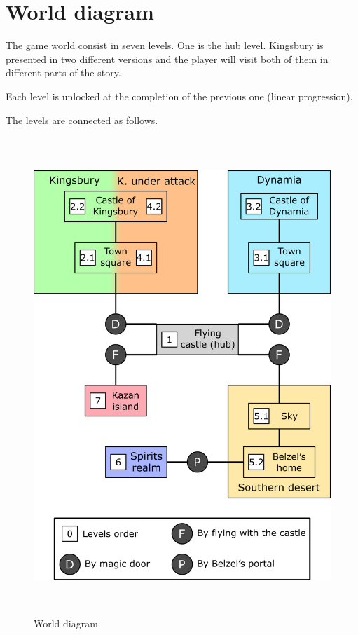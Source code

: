 \pagebreak %

\section{World diagram}

The game world consist in seven levels. One is the hub level. Kingsbury is presented in two different versions and the player will visit both of them in different parts of the story.

Each level is unlocked at the completion of the previous one (linear progression).

The levels are connected as follows.

\begin{figure}[H]
  \centering
  \includegraphics[height=18cm]{Images/Diagrams/worldDiagram}
  \caption{World diagram}
\end{figure}

